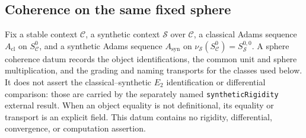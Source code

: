 \subsection{Coherence on the same fixed sphere}

\begin{definition}
  \label{def:sphere-adams-coherence}
  \notready
  Fix a stable context $\mathcal C$, a synthetic context $\mathcal S$ over
  $\mathcal C$, a classical Adams sequence $A_{\mathrm{cl}}$ on
  $S^0_{\mathcal C}$, and a synthetic Adams sequence $A_{\mathrm{syn}}$ on
  $\nu_{\mathcal S}(S^0_{\mathcal C})=S^{0,0}_{\mathcal S}$.  A sphere
  coherence datum records the object identifications, the common unit and
  sphere multiplication, and the grading and naming transports for the classes
  used below.  It does not assert the classical--synthetic $E_2$ identification
  or differential comparison: those are carried by the separately named
  \texttt{syntheticRigidity} external result.  When an object equality is not
  definitional, its equality or transport is an explicit field.  This datum
  contains no rigidity, differential, convergence, or computation assertion.
\end{definition}

